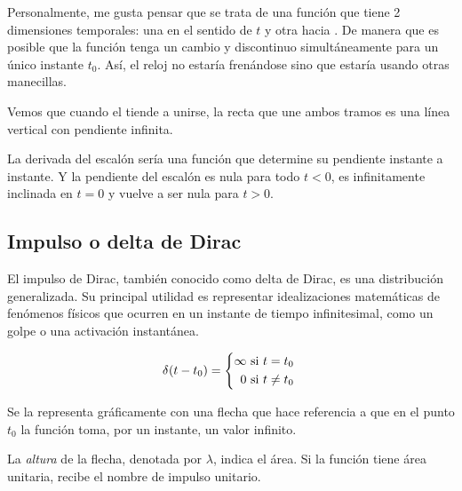 Personalmente, me gusta pensar que se trata de una función que tiene 2 dimensiones temporales: una en el sentido de $t$ y otra hacia .
De manera que es posible que la función tenga un cambio  y discontinuo simultáneamente para un único instante $t_0$.
Así, el reloj no estaría frenándose sino que estaría usando otras manecillas.

Vemos que cuando el  tiende a unirse, la recta que une ambos tramos es una línea vertical con pendiente infinita.

La derivada del escalón sería una función que determine su pendiente instante a instante.
Y la pendiente del escalón es nula para todo $t < 0$, es infinitamente inclinada en $t = 0$ y vuelve a ser nula para $t > 0$.

\subsection{Impulso o delta de Dirac}

El impulso de Dirac, también conocido como delta de Dirac, es una distribución generalizada.
Su principal utilidad es representar idealizaciones matemáticas de fenómenos físicos que ocurren en un instante de tiempo infinitesimal, como un golpe o una activación instantánea.

\begin{mdframed}[style=DefinitionFrame]
    \begin{defn}
    \end{defn}
    \[
        \fx[\delta]{t-t_0} =
        \left\{
        \begin{aligned}
            \infty \text{ si $t=t_0$ }
            \\
            0 \text{ si $t \neq t_0$ }
        \end{aligned}
        \right.
    \]
\end{mdframed}

Se la representa gráficamente con una flecha que hace referencia a que en el punto $t_0$ la función toma, por un instante, un valor infinito.

\begin{center}
    \def\svgwidth{0.6\linewidth}
    
\end{center}

La \emph{altura} de la flecha, denotada por $\lambda$, indica el área.
Si la función tiene área unitaria, recibe el nombre de impulso unitario.

